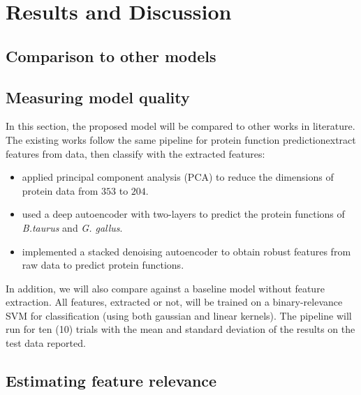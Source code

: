 \chapter{Results and Discussion}
\label{Results}


\section{Comparison to other models}
\label{Benchmarking}

\section{Measuring model quality}
\label{ModelQuality}
\par In this section, the proposed model will be compared to other works in
literature. The existing works follow the same pipeline for protein function
prediction\textemdash extract features from data, then classify with the
extracted features:

\begin{itemize}
    \item \cite{wang2013protein} applied principal component
    analysis (PCA) to reduce the dimensions of protein data from $353$ to
    $204$. 
    \item \cite{chicco2014deep} used a deep autoencoder with two-layers
    to predict the protein functions of \textit{B.taurus} and \textit{G.
    gallus}. 
    \item \cite{miranda2017feature} implemented a stacked denoising
    autoencoder to obtain robust features from raw data to predict protein
    functions.  
\end{itemize}

\par In addition, we will also compare against a baseline model without feature
extraction. All features, extracted or not, will be trained on a
binary-relevance SVM for classification (using both gaussian and linear
kernels). The pipeline will run for ten (10) trials with the mean and
standard deviation of the results on the test data reported. 



\section{Estimating feature relevance}
\label{FeatureRelevance}
